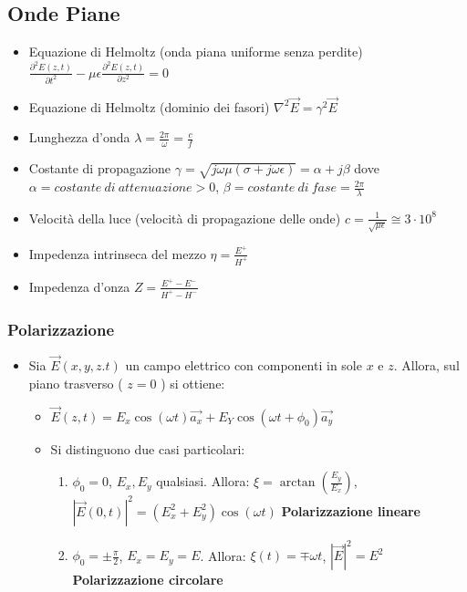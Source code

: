 \documentclass{article}
\begin{document}
\subsection{Onde Piane}
\begin{itemize}
	\item Equazione di Helmoltz (onda piana uniforme senza perdite) \( \frac{\partial^2 E(z, t)}{\partial t^2} - \mu \epsilon \frac{\partial^2 E(z, t)}{\partial z^2} = 0\)
	\item Equazione di Helmoltz (dominio dei fasori) \( \nabla^2 \vec{E} = \gamma^2 \vec{E} \)
	\item Lunghezza d'onda \( \lambda = \frac{2 \pi}{\omega} = \frac{c}{f} \)	
	\item Costante di propagazione \( \gamma = \sqrt{j\omega\mu (\sigma + j \omega \epsilon) } = \alpha + j \beta \) dove \( \alpha = costante\ di\ attenuazione > 0\), \newline \( \beta = costante\ di\ fase = \frac{2 \pi}{\lambda} \)
	\item Velocità della luce (velocità di propagazione delle onde) \( c = \frac{1}{\sqrt{\mu \epsilon}} \cong 3 \cdot 10^8 \)
	\item Impedenza intrinseca del mezzo \( \eta = \frac{E^+}{H^+} \)
	\item Impedenza d'onza \( Z = \frac{E^+ - E^-}{H^+ - H^-} \)
\end{itemize}

\subsubsection{Polarizzazione}
\begin{itemize}
	\item Sia \( \vec{E}(x, y, z. t) \) un campo elettrico con componenti in sole \( x \) e \( z \). Allora, sul piano trasverso ( \( z = 0 \) ) si ottiene:
	\begin{itemize}
		\item \( \vec{E}(z, t) = E_x \cos ( \omega t) \vec{a_x} + E_Y \cos( \omega t + \phi_0) \vec{a_y}  \)
		\item Si distinguono due casi particolari:
		\begin{enumerate}
			\item \( \phi_0 = 0 \), \( E_x, E_y \) qualsiasi. Allora: \( \xi  = \arctan(\frac{E_y}{E_x}) \), \( |\vec{E}(0, t)|^2 = (E_x^2 + E_y^2) \cos(\omega t) \) \textbf{Polarizzazione lineare}
			\item  \( \phi_0 = \pm \frac{\pi}{2} \), \( E_x = E_y = E \). Allora: \( \xi(t)  = \mp \omega t \), \( |\vec{E}|^2 = E^2 \) \textbf{Polarizzazione circolare}
		\end{enumerate}
	\end{itemize}	  
\end{itemize}
\end{document}
